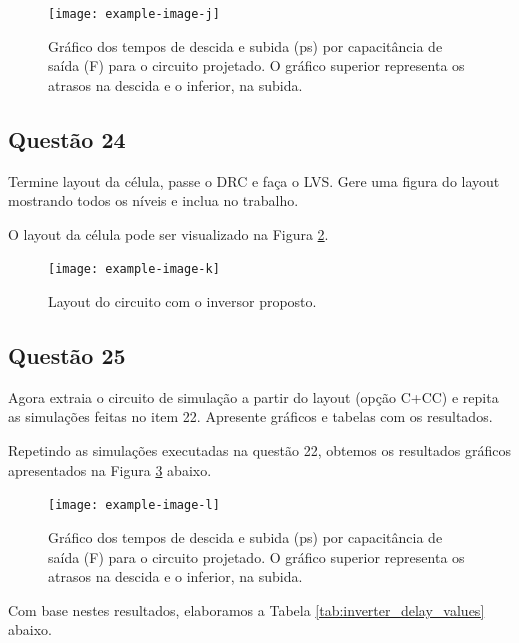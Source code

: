 \documentclass[12pt,a4paper]{article}
\begin{document}
\begin{figure}[H]
    \centering
    \texttt{[image: example-image-j]}
    \caption{Gráfico dos tempos de descida e subida (ps) por capacitância de saída (F) para o circuito projetado. O gráfico superior representa os atrasos na descida e o inferior, na subida.}
    \label{fig:inverter_delay_graphs}
\end{figure}

\subsection*{Questão 24}

Termine layout da célula, passe o DRC e faça o LVS. Gere uma figura do layout mostrando todos os níveis e inclua no trabalho.

O layout da célula pode ser visualizado na Figura \ref{fig:cell_layout}.

\begin{figure}[H]
    \centering
    \texttt{[image: example-image-k]}
    \caption{Layout do circuito com o inversor proposto.}
    \label{fig:cell_layout}
\end{figure}

\subsection*{Questão 25}

Agora extraia o circuito de simulação a partir do layout (opção C+CC) e repita as simulações feitas no item 22. Apresente gráficos e tabelas com os resultados.

Repetindo as simulações executadas na questão 22, obtemos os resultados gráficos apresentados na Figura \ref{fig:inverter_cc_delay_graphs} abaixo.

\begin{figure}[H]
    \centering
    \texttt{[image: example-image-l]}
    \caption{Gráfico dos tempos de descida e subida (ps) por capacitância de saída (F) para o circuito projetado. O gráfico superior representa os atrasos na descida e o inferior, na subida.}
    \label{fig:inverter_cc_delay_graphs}
\end{figure}

Com base nestes resultados, elaboramos a Tabela \ref{tab:inverter_delay_values} abaixo.
\end{document}

